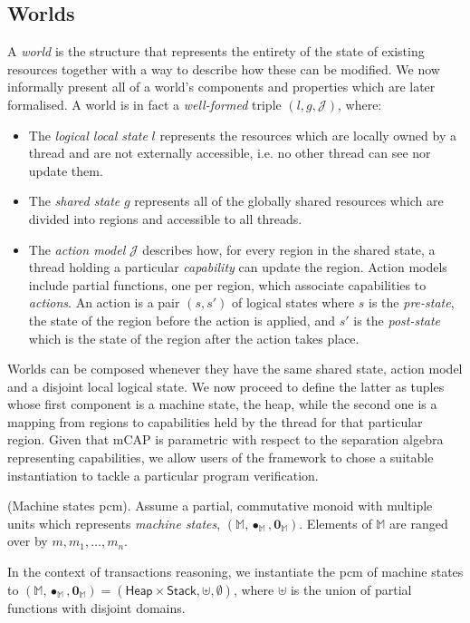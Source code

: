 \subsection{Worlds} \label{worlds}

A \textit{world} is the structure that represents the entirety of the state of existing resources together with a way to describe how these can be modified. We now informally present all of a world's components and properties which are later formalised. A world is in fact a \textit{well-formed} triple $(l, g, \mathcal{J})$, where:
\begin{itemize}
	\item The \textit{logical local state} $l$ represents the resources which are locally owned by a thread and are not externally accessible, i.e. no other thread can see nor update them.
	\item The \textit{shared state} $g$ represents all of the globally shared resources which are divided into regions and accessible to all threads.
	\item The \textit{action model} $\mathcal{J}$ describes how, for every region in the shared state, a thread holding a particular \textit{capability} can update the region. Action models include partial functions, one per region, which associate capabilities to \textit{actions}. An action is a pair $(s, s')$ of logical states where $s$ is the \textit{pre-state}, the state of the region before the action is applied, and $s'$ is the \textit{post-state} which is the state of the region after the action takes place.
\end{itemize}

Worlds can be composed whenever they have the same shared state, action model and a disjoint local logical state. We now proceed to define the latter as tuples whose first component is a machine state, the heap, while the second one is a mapping from regions to capabilities held by the thread for that particular region. Given that mCAP is parametric with respect to the separation algebra representing capabilities, we allow users of the framework to chose a suitable instantiation to tackle a particular program verification.

\begin{param}
	(Machine states pcm).
	Assume a partial, commutative monoid with multiple units which represents \emph{machine states}, $(\mathbb{M}, \bullet_\mathbb{M}, \mathbf{0}_\mathbb{M})$. Elements of $\mathbb{M}$ are ranged over by $m, m_1, \ldots, m_n$.
\end{param}
In the context of transactions reasoning, we instantiate the pcm of machine states to $(\mathbb{M}, \bullet_\mathbb{M}, \mathbf{0}_\mathbb{M}) = (\mathsf{Heap} \times \mathsf{Stack}, \uplus, \emptyset)$, where $\uplus$ is the union of partial functions with disjoint domains.

